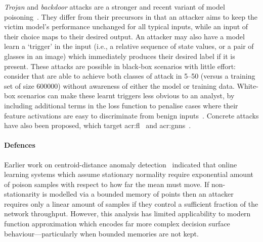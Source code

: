 \emph{Trojan} and \emph{backdoor} attacks are a stronger and recent variant of model poisoning~\parencite{DBLP:journals/corr/abs-1712-05526}.
They differ from their precursors in that an attacker aims to keep the victim model's performance unchanged for all typical inputs, while an input of their choice maps to their desired output.
An attacker may also have a model learn a `trigger' in the input (i.e., a relative sequence of state values, or a pair of glasses in an image) which immediately produces their desired label if it is present.
These attacks are possible in black-box scenarios with little effort: consider that \citeauthor{DBLP:journals/corr/abs-1712-05526} are able to achieve both classes of attack in \numrange{5}{50} (versus a training set of size \num{600000}) without awareness of either the model or training data.
White-box scenarios can make these learnt triggers less obvious to an analyst, by including additional terms in the loss function to penalise cases where their feature activations are easy to discriminate from benign inputs~\parencite{DBLP:conf/eurosp/TanS20}.
Concrete attacks have also been proposed, which target \gls{acr:fl}~\parencite{DBLP:conf/aistats/BagdasaryanVHES20} and \glspl{acr:gnn}~\parencite{DBLP:conf/uss/XiPJ021}.


\paragraph{Defences}
Earlier work on centroid-distance anomaly detection~\parencite{DBLP:journals/jmlr/KloftL10} indicated that online learning systems which assume stationary normality require exponential amount of poison samples with respect to how far the mean must move.
If non-stationarity is modelled via a bounded memory of points then an attacker requires only a linear amount of samples if they control a sufficient fraction of the network throughput.
However, this analysis has limited applicability to modern function approximation which encodes far more complex decision surface behaviour---particularly when bounded memories are not kept.

